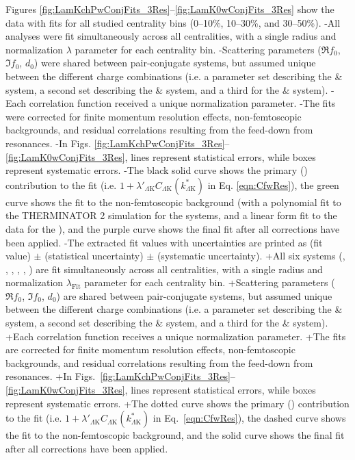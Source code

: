 \begin{table}[htbp]
\begin{table}[htbp]
 Figures \ref{fig:LamKchPwConjFits_3Res}--\ref{fig:LamK0wConjFits_3Res} show the \LamK data with fits for all studied centrality bins (0--10\%, 10--30\%, and 30--50\%). 
-All analyses were fit simultaneously across all centralities, with a single radius and normalization $\lambda$ parameter for each centrality bin.
-Scattering parameters ($\Re f_{0}$, $\Im f_{0}$, $d_{0}$) were shared between pair-conjugate systems, but assumed unique between the different \LamK charge combinations (i.e. a parameter set describing the \LamKchP \& \ALamKchM system, a second set describing the \LamKchM \& \ALamKchP system, and a third for the \LamKs \& \ALamKs system).
-Each correlation function received a unique normalization parameter.
-The fits were corrected for finite momentum resolution effects, non-femtoscopic backgrounds, and residual correlations resulting from the feed-down from resonances.
-In Figs. \ref{fig:LamKchPwConjFits_3Res}--\ref{fig:LamK0wConjFits_3Res}, lines represent statistical errors, while boxes represent systematic errors.  
-The black solid curve shows the primary (\LamK) contribution to the fit (i.e. $1 + \lambda'_{\Lambda\mathrm{K}}C_{\Lambda\mathrm{K}}(k^{*}_{\Lambda\mathrm{K}})$ in Eq. \ref{eqn:CfwRes}), the green curve shows the fit to the non-femtoscopic background (with a polynomial fit to the THERMINATOR 2 simulation for the \LamKpm systems, and a linear form fit to the data for the \LamKs), and the purple curve shows the final fit after all corrections have been applied.
-The extracted fit values with uncertainties are printed as (fit value) $\pm$ (statistical uncertainty) $\pm$ (systematic uncertainty).
+All six \LamK systems (\LamKchP, \ALamKchM, \LamKchM, \ALamKchP, \LamKs, \ALamKs) are fit simultaneously across all centralities, with a single radius and normalization $\lambda_{\mathrm{Fit}}$ parameter for each centrality bin.
+Scattering parameters ($\Re f_{0}$, $\Im f_{0}$, $d_{0}$) are shared between pair-conjugate systems, but assumed unique between the different \LamK charge combinations (i.e. a parameter set describing the \LamKchP \& \ALamKchM system, a second set describing the \LamKchM \& \ALamKchP system, and a third for the \LamKs \& \ALamKs system).
+Each correlation function receives a unique normalization parameter.
+The fits are corrected for finite momentum resolution effects, non-femtoscopic backgrounds, and residual correlations resulting from the feed-down from resonances.
+In Figs.\ \ref{fig:LamKchPwConjFits_3Res}--\ref{fig:LamK0wConjFits_3Res}, lines represent statistical errors, while boxes represent systematic errors.  
+The dotted curve shows the primary (\LamK) contribution to the fit (i.e. $1 + \lambda'_{\Lambda\mathrm{K}}C_{\Lambda\mathrm{K}}(k^{*}_{\Lambda\mathrm{K}})$ in Eq.\ \ref{eqn:CfwRes}), the dashed curve shows the fit to the non-femtoscopic background, and the solid curve shows the final fit after all corrections have been applied.
 

\end{table}
\end{table}
